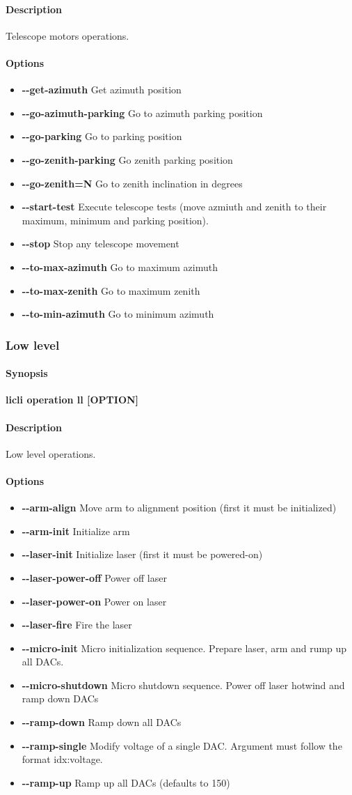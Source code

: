 \documentclass[letterpaper, 10 pt]{article}
\newcommand{\cmdsection}[1]{\paragraph{#1}\mbox{}\par}
\begin{document}
\cmdsection{Description} Telescope motors operations.\\
\cmdsection{Options}
\begin{itemize}
	\item[] \textbf{-{}-get-azimuth} Get azimuth position
	\item[] \textbf{-{}-go-azimuth-parking} Go to azimuth parking position
	\item[] \textbf{-{}-go-parking} Go to parking position
	\item[] \textbf{-{}-go-zenith-parking} Go zenith parking position
	\item[] \textbf{-{}-go-zenith=N} Go to zenith inclination in degrees
	\item[] \textbf{-{}-start-test} Execute telescope tests (move azmiuth and zenith to their maximum, minimum and parking position).
	\item[] \textbf{-{}-stop} Stop any telescope movement
	\item[] \textbf{-{}-to-max-azimuth} Go to maximum azimuth
	\item[] \textbf{-{}-to-max-zenith} Go to maximum zenith
	\item[] \textbf{-{}-to-min-azimuth} Go to minimum azimuth		
\end{itemize}
\subsubsection{Low level}
\cmdsection{Synopsis} \textbf{licli operation ll [OPTION]}\\

\cmdsection{Description} Low level operations.\\
\cmdsection{Options}
\begin{itemize}
	\item[] \textbf{-{}-arm-align} Move arm to alignment position (first it must be initialized)
	\item[] \textbf{-{}-arm-init} Initialize arm
	\item[] \textbf{-{}-laser-init} Initialize laser (first it must be powered-on)
	\item[] \textbf{-{}-laser-power-off} Power off laser
	\item[] \textbf{-{}-laser-power-on} Power on laser
	\item[] \textbf{-{}-laser-fire} Fire the laser
	\item[] \textbf{-{}-micro-init} Micro initialization sequence. Prepare laser, arm and rump up all DACs.
	\item[] \textbf{-{}-micro-shutdown} Micro shutdown sequence. Power off laser hotwind and ramp down DACs
	\item[] \textbf{-{}-ramp-down} Ramp down all DACs
	\item[] \textbf{-{}-ramp-single} Modify voltage of a single DAC. Argument must follow the format idx:voltage.
	\item[] \textbf{-{}-ramp-up} Ramp up all DACs (defaults to 150)
\end{itemize}
\end{document}
